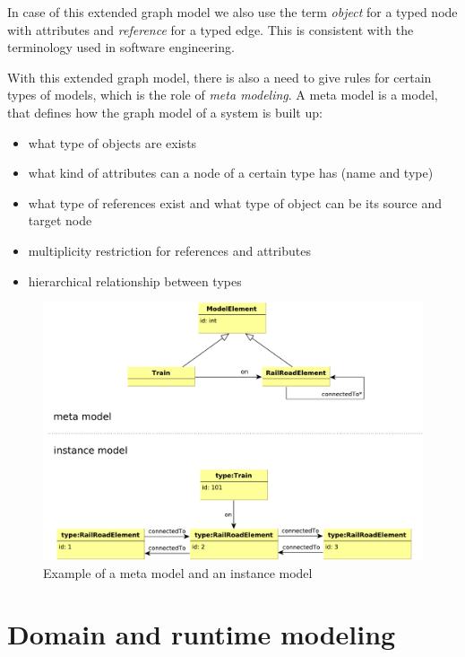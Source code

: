 In case of this extended graph model we also use the term \emph{object} for a typed node with attributes and \emph{reference} for a typed edge. This is consistent with the terminology used in software engineering.

With this extended graph model, there is also a need to give rules for certain types of models, which is the role of \emph{meta modeling}.
A meta model is a model, that defines how the graph model of a system is built up:
\begin{itemize}
	\item what type of objects are exists
	\item what kind of attributes can a node of a certain type has (name and type)
	\item what type of references exist and what type of object can be its source and target node
	\item multiplicity restriction for references and attributes
	\item hierarchical relationship between types
\end{itemize}


\begin{figure}[h]
	\begin{center}
		\includegraphics[width=\textwidth]{figures/metamodel.pdf}
		\caption{ Example of a meta model and an instance model }
		\label{fig:metamodel}
	\end{center}
\end{figure}

\pagebreak

\section{Domain and runtime modeling}

